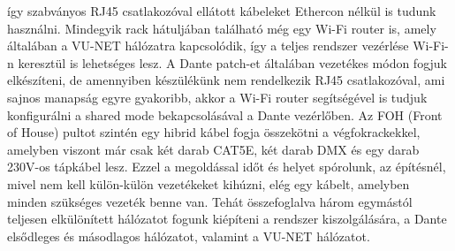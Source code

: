 így szabványos RJ45 csatlakozóval ellátott kábeleket Ethercon nélkül is tudunk használni.
Mindegyik rack hátuljában található még egy Wi-Fi router is, amely általában a VU-NET hálózatra kapcsolódik,
így a teljes rendszer vezérlése Wi-Fi-n keresztül is lehetséges lesz.
A Dante patch-et általában vezetékes módon fogjuk elkészíteni, de amennyiben készülékünk nem rendelkezik RJ45 csatlakozóval,
ami sajnos manapság egyre gyakoribb, akkor a Wi-Fi router segítségével is tudjuk konfigurálni a shared mode bekapcsolásával 
a Dante vezérlőben.
Az FOH (Front of House) pultot szintén egy hibrid kábel fogja összekötni a végfokrackekkel, amelyben viszont
már csak két darab CAT5E, két darab DMX és egy darab 230V-os tápkábel lesz. Ezzel a megoldással időt és helyet spórolunk,
az építésnél, mivel nem kell külön-külön vezetékeket kihúzni, elég egy kábelt, amelyben minden szükséges vezeték benne van.
Tehát összefoglalva három egymástól teljesen elkülönített hálózatot fogunk kiépíteni a rendszer kiszolgálására,
a Dante elsődleges és másodlagos hálózatot, valamint a VU-NET hálózatot.

